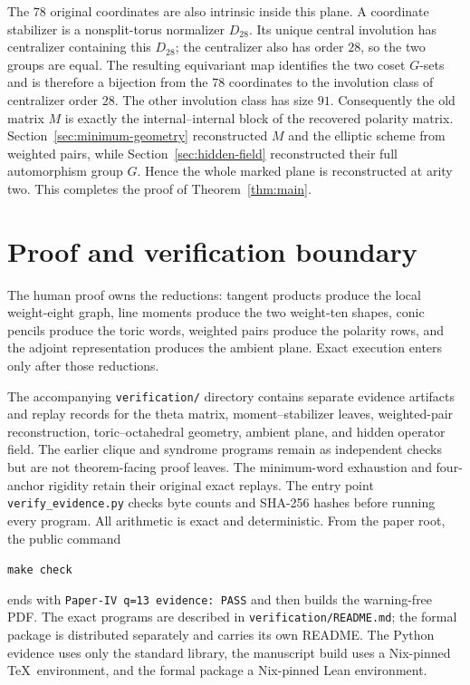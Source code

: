 \documentclass[11pt]{article}
\theoremstyle{definition}
\theoremstyle{remark}
\begin{document}
The \(78\) original coordinates are also intrinsic inside this plane.  A
coordinate stabilizer is a nonsplit-torus normalizer \(D_{28}\).  Its unique
central involution has centralizer containing this \(D_{28}\); the
centralizer also has order \(28\), so the two groups are equal.  The resulting
equivariant map identifies the two coset \(G\)-sets and is therefore a
bijection from the 78 coordinates to the involution class of centralizer
order \(28\).  The other involution class
has size \(91\).
Consequently the old matrix \(M\) is exactly the internal--internal block of
the recovered polarity matrix.  Section~\ref{sec:minimum-geometry}
reconstructed \(M\) and the elliptic scheme from weighted pairs, while
Section~\ref{sec:hidden-field} reconstructed their full automorphism group
\(G\).  Hence the whole marked plane is reconstructed at arity two.  This
completes the proof of Theorem~\ref{thm:main}.

\section{Proof and verification boundary}

The human proof owns the reductions: tangent products produce the local
weight-eight graph, line moments produce the two weight-ten shapes, conic
pencils produce the toric words, weighted pairs produce the polarity rows,
and the adjoint representation produces the ambient plane.  Exact execution
enters only after those reductions.

The accompanying \nolinkurl{verification/} directory contains separate
evidence artifacts and replay records for the theta matrix,
moment--stabilizer leaves,
weighted-pair reconstruction, toric--octahedral geometry, ambient plane, and
hidden operator field.  The earlier clique and syndrome programs remain as
independent checks but are not theorem-facing proof leaves.  The minimum-word
exhaustion and four-anchor rigidity retain their original exact replays.
The entry point \nolinkurl{verify_evidence.py} checks byte counts and SHA-256
hashes before running every program.  All arithmetic is exact and
deterministic.
From the paper root, the public command
\begin{center}
\small\texttt{make check}
\end{center}
ends with \texttt{Paper-IV q=13 evidence: PASS} and then builds the
warning-free PDF.  The exact programs are described in
\nolinkurl{verification/README.md}; the formal package is distributed
separately and carries its own README.  The Python evidence uses only the
standard library, the manuscript build uses a Nix-pinned \TeX\ environment,
and the formal package a Nix-pinned Lean environment.
\end{document}
